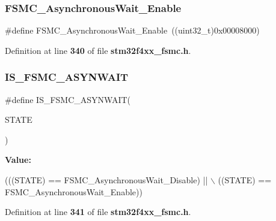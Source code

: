 \subsubsection{F\+S\+M\+C\+\_\+\+Asynchronous\+Wait\+\_\+\+Enable}
{\footnotesize\ttfamily \#define F\+S\+M\+C\+\_\+\+Asynchronous\+Wait\+\_\+\+Enable~((uint32\+\_\+t)0x00008000)}



Definition at line \textbf{ 340} of file \textbf{ stm32f4xx\+\_\+fsmc.\+h}.

\mbox{\label{group__FSMC__AsynchronousWait_ga52d579de825316ee058baf11bfb749d6}} 
\subsubsection{I\+S\+\_\+\+F\+S\+M\+C\+\_\+\+A\+S\+Y\+N\+W\+A\+IT}
{\footnotesize\ttfamily \#define I\+S\+\_\+\+F\+S\+M\+C\+\_\+\+A\+S\+Y\+N\+W\+A\+IT(\begin{DoxyParamCaption}\item[{}]{S\+T\+A\+TE }\end{DoxyParamCaption})}

{\bfseries Value\+:}
\begin{DoxyCode}
(((STATE) == FSMC_AsynchronousWait_Disable) || \(\backslash\)
                                 ((STATE) == FSMC_AsynchronousWait_Enable))
\end{DoxyCode}


Definition at line \textbf{ 341} of file \textbf{ stm32f4xx\+\_\+fsmc.\+h}.

